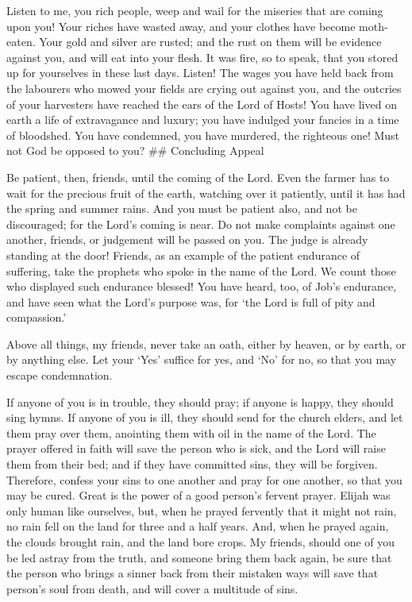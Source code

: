  Listen to me, you rich people, weep and wail for the
miseries that are coming upon you!  Your riches have wasted
away, and your clothes have become moth-eaten.  Your gold
and silver are rusted; and the rust on them will be evidence against
you, and will eat into your flesh. It was fire, so to speak, that you
stored up for yourselves in these last days.  Listen! The
wages you have held back from the labourers who mowed your fields are
crying out against you, and the outcries of your harvesters have reached
the ears of the Lord of Hosts!  You have lived on earth a
life of extravagance and luxury; you have indulged your fancies in a
time of bloodshed.  You have condemned, you have murdered,
the righteous one! Must not God be opposed to you? \#\# Concluding
Appeal

 Be patient, then, friends, until the coming of the Lord.
Even the farmer has to wait for the precious fruit of the earth,
watching over it patiently, until it has had the spring and summer
rains.  And you must be patient also, and not be
discouraged; for the Lord's coming is near.  Do not make
complaints against one another, friends, or judgement will be passed on
you. The judge is already standing at the door!  Friends,
as an example of the patient endurance of suffering, take the prophets
who spoke in the name of the Lord.  We count those who
displayed such endurance blessed! You have heard, too, of Job's
endurance, and have seen what the Lord's purpose was, for `the Lord is
full of pity and compassion.'

 Above all things, my friends, never take an oath, either
by heaven, or by earth, or by anything else. Let your `Yes' suffice for
yes, and `No' for no, so that you may escape condemnation.

 If anyone of you is in trouble, they should pray; if
anyone is happy, they should sing hymns.  If anyone of you
is ill, they should send for the church elders, and let them pray over
them, anointing them with oil in the name of the Lord.  The
prayer offered in faith will save the person who is sick, and the Lord
will raise them from their bed; and if they have committed sins, they
will be forgiven.  Therefore, confess your sins to one
another and pray for one another, so that you may be cured. Great is the
power of a good person's fervent prayer.  Elijah was only
human like ourselves, but, when he prayed fervently that it might not
rain, no rain fell on the land for three and a half years. 
And, when he prayed again, the clouds brought rain, and the land bore
crops.  My friends, should one of you be led astray from
the truth, and someone bring them back again,  be sure that
the person who brings a sinner back from their mistaken ways will save
that person's soul from death, and will cover a multitude of sins.
